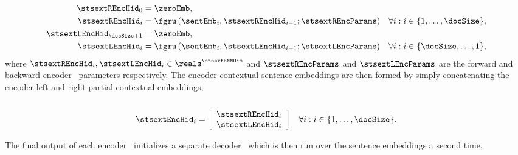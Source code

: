 \noindent{}\\[-40pt]
\begin{align}
        \stsextREncHid_0  &= \zeroEmb, \\
\stsextREncHid_i & = \fgru\left(
            \sentEmb_i, \stsextREncHid_{i-1}; 
            \stsextREncParams\right) &
\forall i : i \in \{1,\ldots,\docSize\}, \\
        \stsextLEncHid_{\docSize + 1}  &= \zeroEmb, \\
\stsextLEncHid_i &= \fgru\left(
            \sentEmb_i, \stsextLEncHid_{i+1}; 
            \stsextLEncParams\right) &
\forall i : i \in \{\docSize,\ldots,1\}, 
\end{align}
where $\stsextREncHid_i,\stsextLEncHid_i \in \reals^{\stsextRNNDim}$ and
$\stsextREncParams$ and $\stsextLEncParams$ are the forward and backward
encoder \gru~parameters respectively. The encoder contextual sentence
embeddings are then formed by simply concatenating the encoder left and right
partial contextual embeddings,\\

\noindent{}\\[-20pt]
\begin{align}
        \stsextEncHid_i & = \left[\begin{array}{c}
            \stsextREncHid_i\\ 
            \stsextLEncHid_i\end{array}\right]  &
\forall i :  i \in \{1,\ldots,\docSize\}.
\end{align}




The final output of each encoder \gru~initializes a separate decoder \gru~which
is then run over the sentence embeddings a second time, \\


